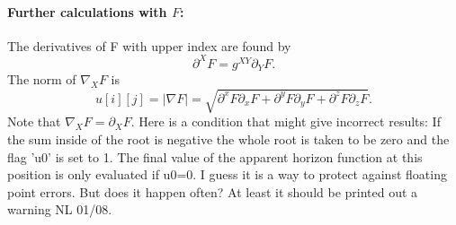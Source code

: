 \documentclass[11pt,a4paper,twoside]{article}
\begin{document}
\paragraph{Further calculations with $F$:}
The derivatives of F with upper index are found by
\begin{equation}
  \partial^X F = g^{XY} \partial_Y F.
\end{equation}
The norm of $\nabla_X F$ is 
\begin{equation}
  u[i][j]=|\nabla F | = \sqrt{ \partial^x F \partial_x F
                              +\partial^y F \partial_y F
                              +\partial^z F \partial_z F}.
\end{equation}
Note that $\nabla_X F =\partial_X F$. 
\warningsymbol Here is a condition that might give incorrect results: If the sum inside of 
the root is negative the whole root is taken to be zero and the flag 'u0'
is set to 1. The final value of the apparent horizon function at this 
position is only evaluated if u0=0.
I guess it is a way to protect against floating point errors. But does
it happen often? At least it should be printed out a warning NL 01/08.
\end{document}
